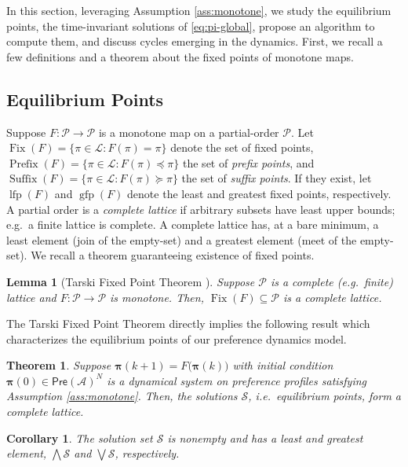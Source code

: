 \documentclass[conference]{ieeeconf}
\newcommand{\A}{\mathcal{A}}
\renewcommand{\P}{\mathcal{P}}
\renewcommand{\S}{\mathcal{S}}
\newcommand{\Pref}{\mathsf{Pre}}
\renewcommand{\L}{\mathcal{L}}
\newcommand{\profile}{\boldsymbol{\pi}}
\newcommand{\bigjoin}{\bigvee}
\newcommand{\bigmeet}{\bigwedge}
\DeclareMathOperator{\Fix}{Fix}
\DeclareMathOperator{\Pre}{Prefix}
\DeclareMathOperator{\Post}{Suffix}
\DeclareMathOperator{\lfp}{lfp}
\DeclareMathOperator{\gfp}{gfp}
\newtheorem{theorem}{Theorem}
\newtheorem{lemma}{Lemma}
\newtheorem{corollary}{Corollary}
\begin{document}
In this section, leveraging Assumption \ref{ass:monotone}, we study the equilibrium points, the time-invariant solutions of \eqref{eq:pi-global}, propose an algorithm to compute them, and discuss cycles emerging in the dynamics. First, we recall a few definitions and a theorem about the fixed points of monotone maps. 

\subsection{Equilibrium Points}

Suppose $F: \P \to \P$ is a monotone map on a partial-order $\P$. Let $\Fix(F) = \{ \pi \in \L: F(\pi) = \pi \}$ denote the set of fixed points, $\Pre(F) = \{ \pi \in \L : F(\pi) \preceq \pi\}$ the set of \emph{prefix points}, and $\Post(F) =\{ \pi \in \L : F(\pi) \succeq \pi\}$ the set of \emph{suffix points}. If they exist, let $\lfp(F)$ and $\gfp(F)$ denote the least and greatest fixed points, respectively. A partial order is a \emph{complete lattice} if arbitrary subsets have least upper bounds; e.g.~a finite lattice is complete. A complete lattice has, at a bare minimum, a least element (join of the empty-set) and a greatest element (meet of the empty-set). We recall a theorem guaranteeing existence of fixed points.

\begin{lemma}[Tarski Fixed Point Theorem \cite{tarski}] \label{lem:tfpt}
    Suppose $\P$ is a complete (e.g.~finite) lattice and $F: \P \to \P$ is monotone. Then, $\Fix(F) \subseteq \P$ is a complete lattice.
\end{lemma}

The Tarski Fixed Point Theorem directly implies the following result which characterizes the equilibrium points of our preference dynamics model.

\begin{theorem}
    Suppose $\profile(k+1) = F \bigl( \profile(k) \bigr)$ with initial condition $\profile(0) \in \Pref(\A)^N$ is a dynamical system on preference profiles satisfying Assumption \ref{ass:monotone}. Then, the solutions $\S$, i.e.~equilibrium points, form a complete lattice.
\end{theorem}
\begin{corollary}
    The solution set $\S$ is nonempty and has a least and greatest element, $\bigmeet \S$ and $\bigjoin \S$, respectively.
\end{corollary}
\end{document}
